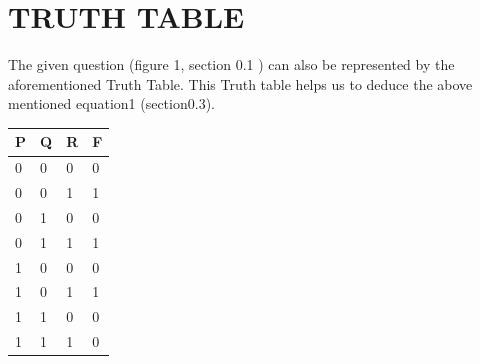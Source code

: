 \documentclass{report}
\begin{document}
\newpage
\section{TRUTH TABLE}

The given question (figure 1, section 0.1 ) can also be represented by the aforementioned Truth Table. This Truth table helps us to deduce the above mentioned equation1 (section0.3).
\begin{table}[]\centering
  \begin{tabular}{|l|l|l|l|}
  \hline
        P & Q & R & F  \\ \hline
        0 & 0 & 0     & 0         \\
        0 & 0 & 1     & 1         \\
        0 & 1 & 0     & 0         \\ 
        0 & 1 & 1     & 1         \\
        1 & 0 & 0     & 0         \\
        1 & 0 & 1     & 1         \\
        1 & 1 & 0     & 0         \\
        1 & 1 & 1     & 0         \\ \hline

\end{tabular}
\end{table}
\end{document}
